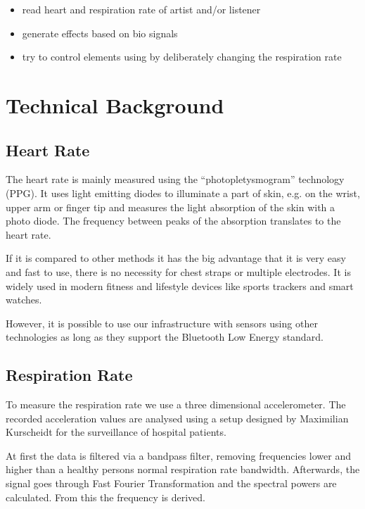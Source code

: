 \documentclass{sigchi-ext}
\begin{document}
\begin{itemize}
  \item read heart and respiration rate of artist and/or listener
  \item generate effects based on bio signals
  \item try to control elements using by deliberately changing the respiration rate
\end{itemize}
\section{Technical Background}

\subsection{Heart Rate}

The heart rate is mainly measured using the ``photopletysmogram'' technology (PPG).
It uses light emitting diodes to illuminate a part of skin, e.g. on the wrist, upper arm
or finger tip and measures the light absorption of the skin with a photo diode. The frequency
between peaks of the absorption translates to the heart rate. %

If it is compared to other methods it has the big advantage that it is very easy and fast
to use, there is no necessity for chest straps or multiple electrodes. It is widely used
in modern fitness and lifestyle devices like sports trackers and smart watches.

However, it is possible to use our infrastructure with sensors using other technologies
as long as they support the Bluetooth Low Energy standard.

\subsection{Respiration Rate}

To measure the respiration rate we use a three dimensional accelerometer. The recorded
acceleration values are analysed using a setup designed by Maximilian Kurscheidt for
the surveillance of hospital patients\cite{kurscheidt2016open}.

At first the data is filtered via a bandpass filter, removing frequencies lower and higher
than a healthy persons normal respiration rate bandwidth. Afterwards, the signal goes through
Fast Fourier Transformation and the spectral powers are calculated. From this the frequency is
derived. %
\end{document}
